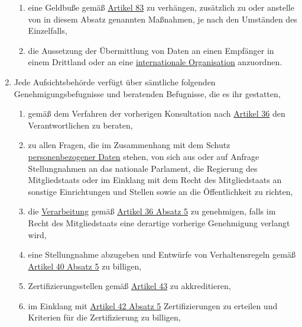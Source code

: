 \begin{enumerate}
\begin{enumerate}
    \item eine Geldbuße gemäß \hyperref[ch:83]{Artikel 83} zu verhängen, zusätzlich zu oder anstelle von in diesem
     Absatz genannten Maßnahmen, je nach den Umständen des Einzelfalls,
    \label{itm:58-2i}

    \item die Aussetzung der Übermittlung von Daten an einen Empfänger in einem Drittland oder an eine \hyperref[itm:04-29]{internationale
     Organisation} anzuordnen.
    \label{itm:58-2j}

  \end{enumerate}

  \item Jede Aufsichtsbehörde verfügt über sämtliche folgenden Genehmigungsbefugnisse und beratenden Befugnisse, die es
   ihr gestatten,
  \label{itm:58-3}

  \begin{enumerate}
  
    \item gemäß dem Verfahren der vorherigen Konsultation nach \hyperref[ch:36]{Artikel 36} den Verantwortlichen zu
     beraten,
    \label{itm:58-3a}

    \item zu allen Fragen, die im Zusammenhang mit dem Schutz \hyperref[itm:04-1]{personenbezogener Daten} stehen, von sich aus oder auf
     Anfrage Stellungnahmen an das nationale Parlament, die Regierung des Mitgliedstaats oder im Einklang mit dem Recht
     des Mitgliedstaats an sonstige Einrichtungen und Stellen sowie an die Öffentlichkeit zu richten,
    \label{itm:58-3b}

    \item die \hyperref[itm:04-2]{Verarbeitung} gemäß \hyperref[itm:36-5]{Artikel 36 Absatz 5} zu genehmigen, falls im Recht des
     Mitgliedstaats eine derartige vorherige Genehmigung verlangt wird,
    \label{itm:58-3c}

    \item eine Stellungnahme abzugeben und Entwürfe von Verhaltensregeln gemäß \hyperref[itm:40-5]{Artikel 40 Absatz 5}
     zu billigen,
    \label{itm:58-3d}

    \item Zertifizierungsstellen gemäß \hyperref[ch:43]{Artikel 43} zu akkreditieren,
    \label{itm:58-3e}

    \item im Einklang mit \hyperref[itm:42-5]{Artikel 42 Absatz 5} Zertifizierungen zu erteilen und Kriterien für die
     Zertifizierung zu billigen,
    \label{itm:58-3f}


\end{enumerate}
\end{enumerate}
